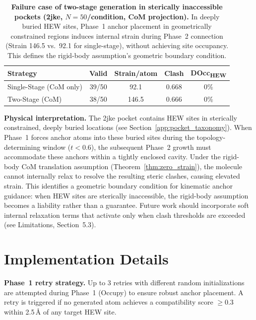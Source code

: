 \documentclass{article}
\begin{document}
\begin{table}[H]
  \centering
  \caption{\textbf{Failure case of two-stage generation in sterically
    inaccessible pockets (2jke, $N=50$/condition, CoM projection).}
    In deeply buried HEW sites, Phase~1 anchor placement in geometrically
    constrained regions induces internal strain during Phase~2 connection
    (Strain 146.5 vs.\ 92.1 for single-stage), without achieving site
    occupancy.  This defines the rigid-body assumption's geometric boundary
    condition.}
  \label{tab:app_2jke_failure}
  \small
  \begin{tabular}{l c c c c}
    \toprule
    \textbf{Strategy} & \textbf{Valid} & \textbf{Strain/atom} & \textbf{Clash}
    & \textbf{DOcc\textsubscript{HEW}} \\
    \midrule
    Single-Stage (CoM only) & 39/50 & 92.1 & 0.668 & 0\% \\
    Two-Stage (CoM)         & 38/50 & 146.5 & 0.666 & 0\% \\
    \bottomrule
  \end{tabular}
\end{table}

\textbf{Physical interpretation.}
The 2jke pocket contains HEW sites in sterically constrained, deeply buried
locations (see Section~\ref{app:pocket_taxonomy}).  When Phase~1 forces anchor
atoms into these buried sites during the topology-determining window
($t < 0.6$), the subsequent Phase~2 growth must accommodate these anchors
within a tightly enclosed cavity.  Under the rigid-body CoM translation
assumption (Theorem~\ref{thm:zero_strain}), the molecule cannot internally
relax to resolve the resulting steric clashes, causing elevated strain.
This identifies a geometric boundary condition for kinematic anchor guidance:
when HEW sites are sterically inaccessible, the rigid-body assumption becomes
a liability rather than a guarantee.  Future work should incorporate soft
internal relaxation terms that activate only when clash thresholds are
exceeded (see Limitations, Section~5.3).

\section{Implementation Details}

\vspace{4pt}
\noindent\textbf{Phase~1 retry strategy.}
Up to 3 retries with different random initializations are attempted during
Phase~1 (Occupy) to ensure robust anchor placement.  A retry is triggered
if no generated atom achieves a compatibility score $\ge 0.3$ within
2.5\,\AA{} of any target HEW site.
\end{document}

